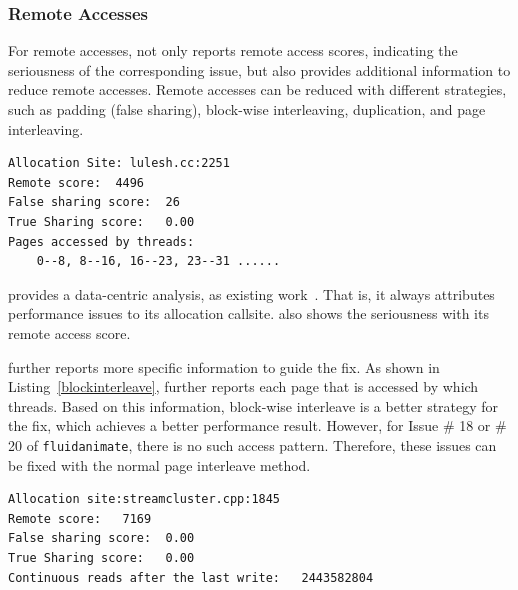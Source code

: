 \subsubsection{Remote Accesses}


For remote accesses, \NP{}  not only reports remote access scores, indicating the seriousness of the corresponding issue, but also provides additional information to reduce remote accesses. Remote accesses can be reduced with different strategies, such as padding (false sharing), block-wise interleaving, duplication, and page interleaving. 

\begin{lstlisting}[caption={Remote access issue of lulesh },label={blockinterleave},captionpos=b]
Allocation Site: lulesh.cc:2251
Remote score:  4496
False sharing score:  26
True Sharing score:   0.00
Pages accessed by threads:
    0--8, 8--16, 16--23, 23--31 ......
\end{lstlisting}

\NP{} provides a data-centric analysis, as existing work~\cite{XuNuma}. That is, it always attributes performance issues to its allocation callsite. \NP{} also shows the seriousness with its remote access score.

\NP{} further reports more specific information to guide the fix. As shown in  Listing~\ref{blockinterleave}, \NP{} further reports each page that is accessed by which threads. Based on this information,  block-wise interleave is a better strategy for the fix, which achieves a better performance result. However, for Issue \# 18 or \# 20 of \texttt{fluidanimate}, there is no such access pattern. Therefore, these issues can be fixed with the normal page interleave method. 

\begin{lstlisting}[caption={Remote access issue of streamcluster},label={duplicate},captionpos=b]
Allocation site:streamcluster.cpp:1845
Remote score:   7169
False sharing score:  0.00
True Sharing score:   0.00
Continuous reads after the last write:   2443582804
\end{lstlisting}

